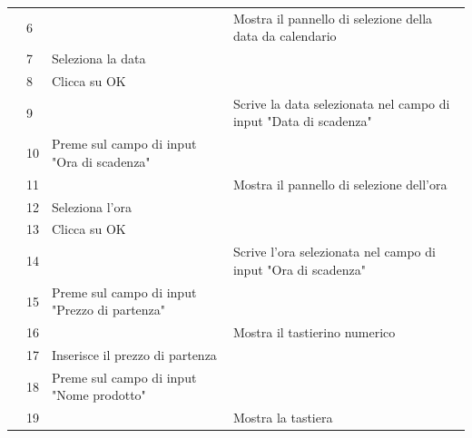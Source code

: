 \begin{longtable}{|C{3.0cm}|C{1.3cm}|L{5.2cm}|L{5.2cm}|}
                        & 6
                        & 
                        & Mostra il pannello di selezione della data da calendario\\
                        & 7
                        & Seleziona la data
                        & \\
                        & 8
                        & Clicca su OK
                        & \\
                        & 9
                        & 
                        & Scrive la data selezionata nel campo di input "Data di scadenza"\\
                        & 10
                        & Preme sul campo di input "Ora di scadenza"
                        & \\
                        & 11
                        & 
                        & Mostra il pannello di selezione dell'ora\\
                        & 12
                        & Seleziona l'ora
                        & \\
                        & 13
                        & Clicca su OK
                        & \\
                        & 14
                        & 
                        & Scrive l'ora selezionata nel campo di input "Ora di scadenza"\\
                        & 15
                        & Preme sul campo di input "Prezzo di partenza"
                        & \\
                        & 16
                        &
                        & Mostra il tastierino numerico \\
                        & 17
                        & Inserisce il prezzo di partenza
                        & \\
                        & 18
                        & Preme sul campo di input "Nome prodotto"
                        & \\
                        & 19
                        &
                        & Mostra la tastiera \\

\end{longtable}
